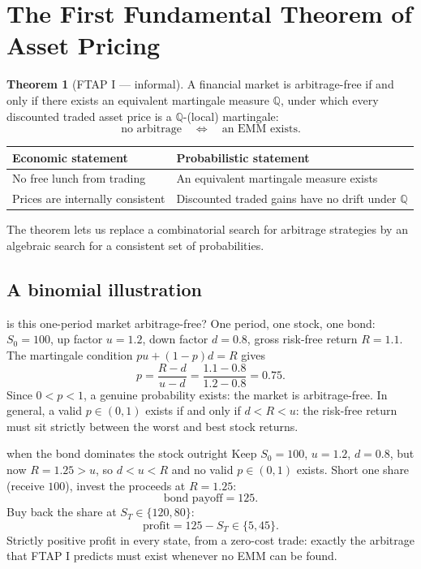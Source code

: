 \documentclass[10pt]{article}
\newcommand{\Q}{\mathbb Q}
\newcommand{\1}{\mathbf 1}
\theoremstyle{definition}
\newtheorem{theorem}[definition]{Theorem}
\begin{document}
\section{The First Fundamental Theorem of Asset Pricing}

\begin{theorem}[FTAP I --- informal]
A financial market is arbitrage-free if and only if there exists an
equivalent martingale measure \(\Q\), under which every discounted traded
asset price is a \(\Q\)-(local) martingale:
\[
\boxed{
\text{no arbitrage}
\quad\Longleftrightarrow\quad
\text{an EMM exists}.}
\]
\end{theorem}

\begin{center}
\renewcommand{\arraystretch}{1.18}
\begin{tabular}{@{}ll@{}}
\toprule
Economic statement & Probabilistic statement\\
\midrule
No free lunch from trading & An equivalent martingale measure exists\\
Prices are internally consistent & Discounted traded gains have no drift under \(\Q\)\\
\bottomrule
\end{tabular}
\end{center}

The theorem lets us replace a combinatorial search for arbitrage strategies
by an algebraic search for a consistent set of probabilities.

\subsection{A binomial illustration}

\begin{boardexample}{is this one-period market arbitrage-free?}
One period, one stock, one bond: \(S_0=100\), up factor \(u=1.2\), down
factor \(d=0.8\), gross risk-free return \(R=1.1\). The martingale condition
\(pu+(1-p)d=R\) gives
\[
p=\frac{R-d}{u-d}=\frac{1.1-0.8}{1.2-0.8}=\boxed{0.75.}
\]
Since \(0<p<1\), a genuine probability exists: the market is arbitrage-free.
In general, a valid \(p\in(0,1)\) exists if and only if \(d<R<u\): the
risk-free return must sit strictly between the worst and best stock returns.
\end{boardexample}

\begin{boardexample}{when the bond dominates the stock outright}
Keep \(S_0=100\), \(u=1.2\), \(d=0.8\), but now \(R=1.25>u\), so
\(d<u<R\) and no valid \(p\in(0,1)\) exists. Short one share (receive
\(100\)), invest the proceeds at \(R=1.25\):
\[
\text{bond payoff}=125.
\]
Buy back the share at \(S_T\in\{120,80\}\):
\[
\text{profit}=125-S_T\in\{5,45\}.
\]
Strictly positive profit in every state, from a zero-cost trade: exactly the
arbitrage that FTAP I predicts must exist whenever no EMM can be found.
\end{boardexample}
\end{document}
